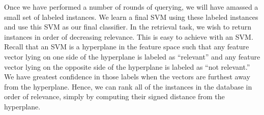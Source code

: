 


Once we have performed a number of rounds of querying, we will have
amassed a small set of labeled instances. We learn a final SVM using these
labeled instances and use this SVM as our final classifier. In the 
retrieval task, we wish to return instances in order of decreasing
relevance. This is easy to achieve with an SVM. Recall that an SVM is
a hyperplane in the feature space such that any feature vector lying
on one side of the hyperplane is labeled as ``relevant'' and any
feature vector lying on the opposite side of the hyperplane is labeled
as ``not relevant.'' We have greatest
confidence in those labels when the vectors
are furthest away from the hyperplane. Hence, we can rank all of
the instances in the database in
order of relevance, simply by computing their
signed distance from the hyperplane.



